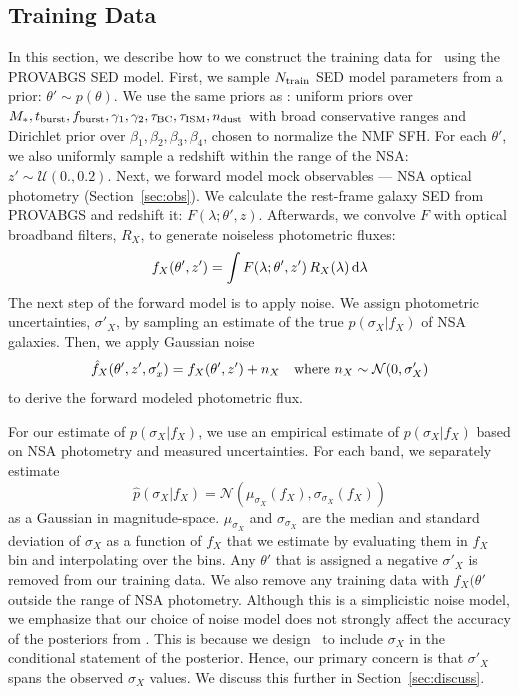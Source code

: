 \subsection{Training Data} \label{sec:training}
In this section, we describe how to we construct the training data for
\sedflow~using the PROVABGS SED model.
First, we sample $N_{\rm train}$ SED model parameters from a prior: $\theta'\sim p(\theta)$. 
We use the same priors as : uniform priors over $M_*,
t_{\rm burst}, f_{\rm burst}, \gamma_1, \gamma_2, \tau_{\rm BC}, \tau_{\rm ISM},
n_{\rm dust}$ with broad conservative ranges and Dirichlet prior over $\beta_1,
\beta_2, \beta_3, \beta_4$, chosen to normalize the NMF SFH.
For each $\theta'$, we also uniformly sample a redshift within the range of the
NSA: $z' \sim \mathcal{U}(0., 0.2)$. 
Next, we forward model mock observables --- NSA optical photometry
(Section~\ref{sec:obs}). 
We calculate the rest-frame galaxy SED from PROVABGS and redshift it: 
$F(\lambda;\theta', z)$. 
Afterwards, we convolve $F$ with optical broadband filters, $R_X$, to generate
noiseless photometric fluxes:
\begin{equation}
    f_X(\theta', z') = \int F(\lambda;\theta', z') \, R_X(\lambda) \, {\rm d}\lambda
\end{equation}
The next step of the forward model is to apply noise. 
We assign photometric uncertainties, $\sigma'_X$, by sampling an estimate of
the true $p(\sigma_X | f_X)$ of NSA galaxies. 
Then, we apply Gaussian noise
\begin{equation} \label{eq:noise} 
    \hat{f}_X(\theta', z', \sigma'_x) = f_X(\theta', z') + n_X  \quad {\rm where}~n_X \sim \mathcal{N}(0, \sigma'_X)
\end{equation}
to derive the forward modeled photometric flux.

For our estimate of $p(\sigma_X | f_X)$, we use an empirical estimate of
$p(\sigma_X | f_X)$ based on NSA photometry and measured uncertainties. 
For each band, we separately estimate  
\begin{equation}
    \hat{p}(\sigma_X | f_X) = \mathcal{N}( \mu_{\sigma_X}(f_X), \sigma_{\sigma_X}(f_X))
\end{equation}
as a Gaussian in magnitude-space. 
$\mu_{\sigma_X}$ and $\sigma_{\sigma_X}$ are the median and standard deviation
of $\sigma_X$ as a function of $f_X$ that we estimate by evaluating them in
$f_X$ bin and interpolating over the bins. 
Any $\theta'$ that is assigned a negative $\sigma'_X$ is removed from our
training data. 
We also remove any training data with $f_X(\theta'$ outside the range of NSA
photometry. 
Although this is a simplicistic noise model, we emphasize that our choice of
noise model does not strongly affect the accuracy of the posteriors from
\sedflow.
This is because we design \sedflow~to include $\sigma_X$ in the conditional
statement of the posterior. 
Hence, our primary concern is that $\sigma'_X$ spans the observed $\sigma_X$
values. 
We discuss this further in Section~\ref{sec:discuss}.

